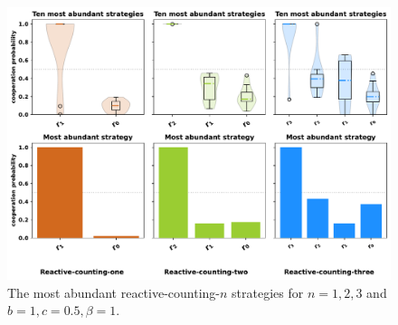 \documentclass{article}
\theoremstyle{definition}
\begin{document}
\begin{figure}[!htbp]
  \includegraphics[width=\textwidth]{figures/abundant_strategies_counting.pdf}
  \caption{The most abundant reactive-counting-$n$ strategies for $n=1,2,3$ and $b=1, c=0.5, \beta=1$.}
\end{figure}


~\\

\end{document}

